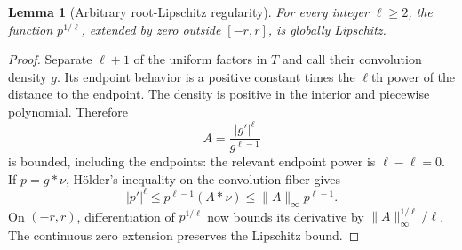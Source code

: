 \documentclass[11pt,a4paper]{article}
\numberwithin{equation}{section}
\newtheorem{lemma}[theorem]{Lemma}
\theoremstyle{definition}\newtheorem{definition}[theorem]{Definition}
\theoremstyle{remark}\newtheorem{remark}[theorem]{Remark}
\newcommand{\norm}[1]{\lVert #1\rVert}
\begin{document}
\begin{lemma}[Arbitrary root-Lipschitz regularity]
\label{lem:root-lipschitz}
For every integer $\ell\ge2$, the function $p^{1/\ell}$, extended by zero outside $[-r,r]$, is globally Lipschitz.
\end{lemma}
\begin{proof}
Separate $\ell+1$ of the uniform factors in $T$ and call their convolution density $g$. Its endpoint behavior is a positive constant times the $\ell$th power of the distance to the endpoint. The density is positive in the interior and piecewise polynomial. Therefore
\[
 A=\frac{|g'|^\ell}{g^{\ell-1}}
\]
is bounded, including the endpoints: the relevant endpoint power is $\ell-\ell=0$. If $p=g*\nu$, H\"older's inequality on the convolution fiber gives
\[
 |p'|^\ell\le p^{\ell-1}(A*\nu)\le\norm A_\infty p^{\ell-1}.
\]
On $(-r,r)$, differentiation of $p^{1/\ell}$ now bounds its derivative by $\norm A_\infty^{1/\ell}/\ell$. The continuous zero extension preserves the Lipschitz bound.
\end{proof}
\end{document}
